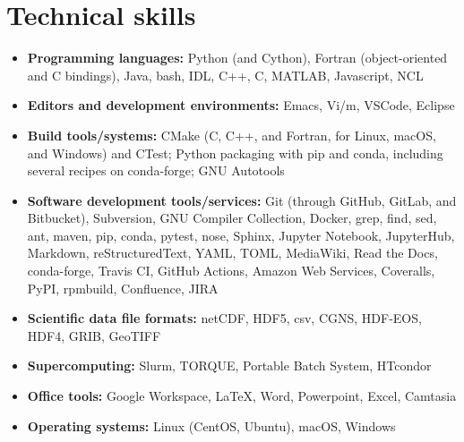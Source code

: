 \section{Technical skills}
\vspace{0.5em}

\begin{itemize}

  \item \textbf{Programming languages:} Python (and Cython),
    Fortran (object-oriented and C bindings), Java, bash,
    IDL, C++, C, MATLAB, Javascript, NCL

  \item \textbf{Editors and development environments:} Emacs, Vi/m, VSCode,
    Eclipse

  \item \textbf{Build tools/systems:} CMake (C, C++, and Fortran, for Linux, macOS,
    and Windows) and CTest; Python packaging with pip and conda, including
    several recipes on conda-forge; GNU Autotools

  \item \textbf{Software development tools/services:} Git (through GitHub,
    GitLab, and Bitbucket), Subversion, GNU Compiler Collection, Docker, grep,
    find, sed, ant, maven, pip, conda, pytest, nose, Sphinx, Jupyter Notebook,
    JupyterHub, Markdown, reStructuredText, YAML, TOML, MediaWiki, Read the
    Docs, conda-forge, {Travis CI}, {GitHub Actions}, {Amazon Web Services},
    Coveralls, PyPI, rpmbuild, Confluence, JIRA

  \item \textbf{Scientific data file formats:} netCDF, HDF5, csv, CGNS, HDF-EOS,
    HDF4, GRIB, GeoTIFF

  \item \textbf{Supercomputing:} Slurm, TORQUE, Portable Batch System, HTcondor

  \item \textbf{Office tools:} Google Workspace, \LaTeX, Word, Powerpoint,
   Excel, Camtasia

  \item \textbf{Operating systems:} Linux (CentOS, Ubuntu), macOS, Windows

\end{itemize}
